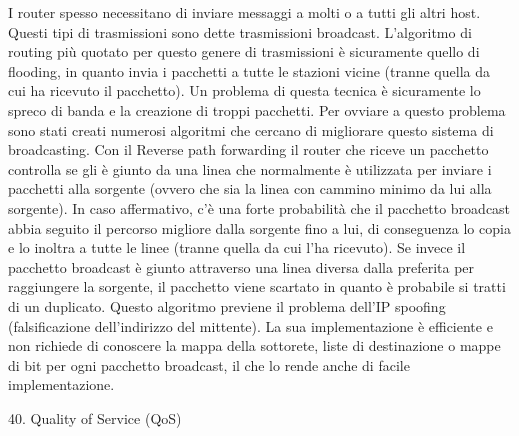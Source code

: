 I router spesso necessitano di inviare messaggi a molti o a tutti gli altri host. Questi tipi di trasmissioni sono dette trasmissioni broadcast.
L’algoritmo di routing più quotato per questo genere di trasmissioni è sicuramente quello di flooding, in quanto invia i pacchetti a tutte le stazioni vicine (tranne quella da cui ha ricevuto il pacchetto). Un problema di questa tecnica è sicuramente lo spreco di banda e la creazione di troppi pacchetti.
Per ovviare a questo problema sono stati creati numerosi algoritmi che cercano di migliorare questo sistema di broadcasting.
Con il Reverse path forwarding il router che riceve un pacchetto controlla se gli è giunto da una linea che normalmente è utilizzata per inviare i pacchetti alla sorgente (ovvero che sia la linea con cammino minimo da lui alla sorgente). In caso affermativo, c’è una forte probabilità che il pacchetto broadcast abbia seguito il percorso migliore dalla sorgente fino a lui, di conseguenza lo copia e lo inoltra a tutte le linee (tranne quella da cui l’ha ricevuto). Se invece il pacchetto broadcast è giunto attraverso una linea diversa dalla preferita per raggiungere la sorgente, il pacchetto viene scartato in quanto è probabile si tratti di un duplicato.
Questo algoritmo previene il problema dell’IP spoofing (falsificazione dell’indirizzo del mittente).
La sua implementazione è efficiente e non richiede di conoscere la mappa della sottorete, liste di destinazione o mappe di bit per ogni pacchetto broadcast, il che lo rende anche di facile implementazione.

40.	Quality of Service (QoS)

